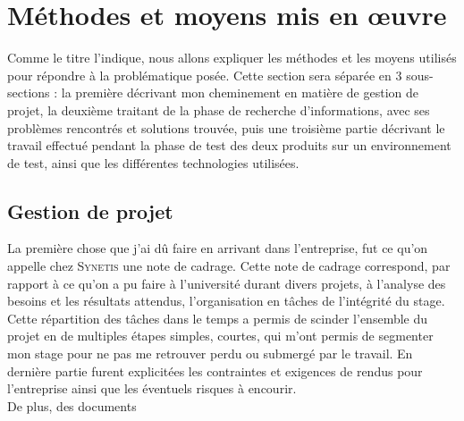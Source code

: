 \section{Méthodes et moyens mis en œuvre}
\label{sec:meth_moy}

Comme le titre l'indique, nous allons expliquer les méthodes et les moyens utilisés pour répondre à la problématique posée. Cette section sera séparée en 3 sous-sections : la première décrivant mon cheminement en matière de gestion de projet, la deuxième traitant de la phase de recherche d'informations, avec ses problèmes rencontrés et solutions trouvée, puis une troisième partie décrivant le travail effectué pendant la phase de test des deux produits sur un environnement de test, ainsi que les différentes technologies utilisées.

\subsection{Gestion de projet}
\label{subsec:gestion}

La première chose que j'ai dû faire en arrivant dans l'entreprise, fut ce qu'on appelle chez \textsc{Synetis} une note de cadrage. Cette note de cadrage correspond, par rapport à ce qu'on a pu faire à l'université durant divers projets, à l'analyse des besoins et les résultats attendus, l'organisation en tâches de l'intégrité du stage. Cette répartition des tâches dans le temps a permis de scinder l'ensemble du projet en de multiples étapes simples, courtes, qui m'ont permis de segmenter mon stage pour ne pas me retrouver perdu ou submergé par le travail. En dernière partie furent explicitées les contraintes et exigences de rendus pour l'entreprise ainsi que les éventuels risques à encourir.\\
De plus, des documents

